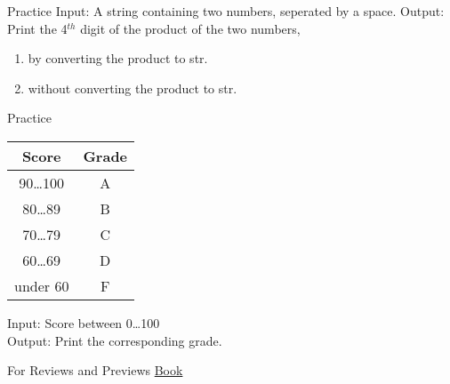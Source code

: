 \documentclass{beamer}
\begin{document}
\begin{frame}{Practice}
  Input: A string containing two numbers, seperated by a space.
  Output: Print the 4$^{th}$ digit of the product of the two numbers,
  \begin{enumerate}
    \item by converting the product to str.
    \item without converting the product to str.
  \end{enumerate}
\end{frame}

\begin{frame}{Practice}
    \begin{tabular}{|*2c|}
      \hline
      Score & Grade \\\hline
      90\ldots100 & A \\
      80\ldots89 & B \\
      70\ldots79 & C \\
      60\ldots69 & D \\
      under 60 & F\\\hline
    \end{tabular}
    \bigskip

    Input: Score between 0\ldots100\\
    Output: Print the corresponding grade.
\end{frame}

\begin{frame}{For Reviews and Previews}
\href{https://github.com/swaroopch/byte-of-python}{Book}
\end{frame}
\end{document}
